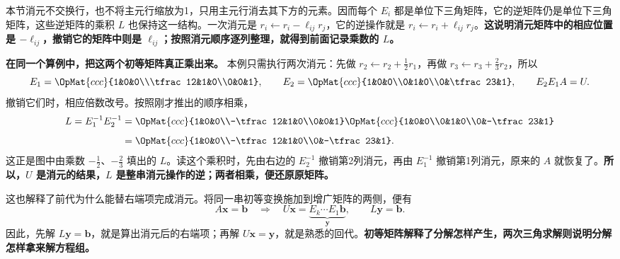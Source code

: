 \documentclass[a4paper,12pt,twoside,openany,fontset=none]{ctexbook}
\numberwithin{equation}{chapter}
\begin{document}
本节消元不交换行，也不将主元行缩放为1，只用主元行消去其下方的元素。因而每个 $E_i$ 都是单位下三角矩阵，它的逆矩阵仍是单位下三角矩阵，这些逆矩阵的乘积 $L$ 也保持这一结构。一次消元是 $r_i\leftarrow r_i-\ell_{ij}r_j$，它的逆操作就是 $r_i\leftarrow r_i+\ell_{ij}r_j$。\textbf{这说明消元矩阵中的相应位置是 $-\ell_{ij}$，撤销它的矩阵中则是 $\ell_{ij}$；按照消元顺序逐列整理，就得到前面记录乘数的 $L$。}

\par\medskip\noindent\textbf{在同一个算例中，把这两个初等矩阵真正乘出来。}
本例只需执行两次消元：先做 $r_2\leftarrow r_2+\tfrac12r_1$，再做 $r_3\leftarrow r_3+\tfrac23r_2$，所以
\[
 E_1=\OpMat{ccc}{1&0&0\\\tfrac12&1&0\\0&0&1},\qquad
 E_2=\OpMat{ccc}{1&0&0\\0&1&0\\0&\tfrac23&1},\qquad
 E_2E_1A=U.
\]
撤销它们时，相应倍数改号。按照刚才推出的顺序相乘，
\[
 \begin{aligned}
 L=E_1^{-1}E_2^{-1}
 &=\OpMat{ccc}{1&0&0\\-\tfrac12&1&0\\0&0&1}
   \OpMat{ccc}{1&0&0\\0&1&0\\0&-\tfrac23&1}\\[5pt]
 &=\OpMat{ccc}{1&0&0\\-\tfrac12&1&0\\0&-\tfrac23&1}.
 \end{aligned}
\]
这正是图中由乘数 $-\tfrac12$、$-\tfrac23$ 填出的 $L$。读这个乘积时，先由右边的 $E_2^{-1}$ 撤销第2列消元，再由 $E_1^{-1}$ 撤销第1列消元，原来的 $A$ 就恢复了。\textbf{所以，$U$ 是消元的结果，$L$ 是整串消元操作的逆；两者相乘，便还原原矩阵。}

这也解释了前代为什么能替右端项完成消元。将同一串初等变换施加到增广矩阵的两侧，便有
\[
 A\boldsymbol x=\boldsymbol b
 \quad\Longrightarrow\quad
 U\boldsymbol x=\underbrace{E_k\cdots E_1\boldsymbol b}_{\boldsymbol y},
 \qquad L\boldsymbol y=\boldsymbol b.
\]
因此，先解 $L\boldsymbol y=\boldsymbol b$，就是算出消元后的右端项；再解 $U\boldsymbol x=\boldsymbol y$，就是熟悉的回代。\textbf{初等矩阵解释了分解怎样产生，两次三角求解则说明分解怎样拿来解方程组。}
\end{document}

